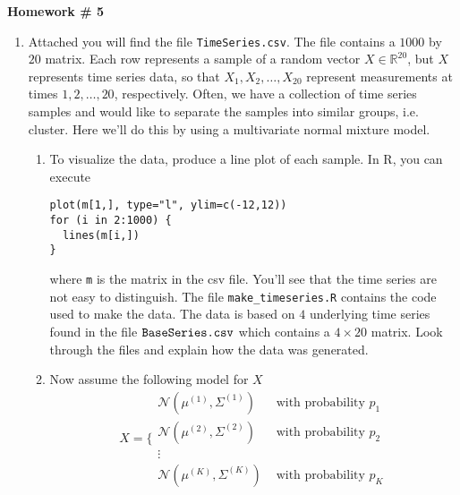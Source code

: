 \documentclass{article}
\begin{document}
\renewcommand{\a}{\textbf{a}}
\renewcommand{\b}{\textbf{b}}
\renewcommand{\d}{\textbf{d}}
\newcommand{\e}{\textbf{e}}

\large

\begin{center}
\textbf{Homework \# 5} \\  
\end{center}

\medskip


\medskip




\begin{enumerate} 

\item Attached you will find the file \verb+TimeSeries.csv+.  The file contains a $1000$ by $20$ matrix.  Each row represents a sample of a random vector $X \in \mathbb{R}^{20}$, but $X$ represents time series data, so that $X_1, X_2, \dots, X_{20}$ represent measurements at times $1, 2, \dots, 20$, respectively.  Often, we have a collection of time series samples and would like to separate the samples into similar groups, i.e. cluster.  Here we'll do this by using a multivariate normal mixture model.  
\begin{enumerate}
\item To visualize the data, produce a line plot of each sample.  In R, you can execute
\begin{verbatim}
plot(m[1,], type="l", ylim=c(-12,12))
for (i in 2:1000) {
  lines(m[i,])
}
\end{verbatim}
where \verb+m+ is the matrix in the csv file.  You'll see that the time series are not easy to distinguish.  The file \verb+make_timeseries.R+ contains the code used to make the data.  The data is based on $4$ underlying time series found in the file $\verb+BaseSeries.csv+$ which contains a $4 \times 20$ matrix.   Look through the files and explain how the data was generated.  
\item Now assume the following model for $X$
\begin{equation}
X = \bigg\{
\begin{array}{cc}
\mathcal{N}(\mu^{(1)}, \Sigma^{(1)}) & \text{ with probability } p_1 \\
\mathcal{N}(\mu^{(2)}, \Sigma^{(2)}) & \text{ with probability } p_2\\
\vdots & \\
\mathcal{N}(\mu^{(K)}, \Sigma^{(K)}) & \text{ with probability } p_K
\end{array}
\end{equation}

\end{enumerate}
\end{enumerate}
\end{document}
